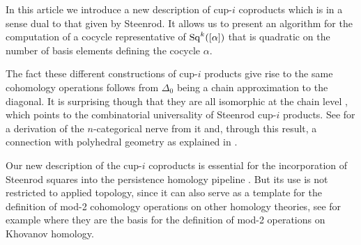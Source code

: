 In this article we introduce a new description of cup-$i$ coproducts which is in a sense dual to that given by Steenrod.
It allows us to present an algorithm for the computation of a cocycle representative of $\mathrm{Sq}^k([\alpha])$ that is quadratic on the number of basis elements defining the cocycle $\alpha$.

The fact these different constructions of cup-$i$ products give rise to the same cohomology operations follows from $\Delta_0$ being a chain approximation to the diagonal.
It is surprising though that they are all isomorphic at the chain level \cite{medina2018axiomatic}, which points to the combinatorial universality of Steenrod cup-$i$ products.
See \cite{medina2020globular} for a derivation of the $n$-categorical nerve from it and, through this result, a connection with polyhedral geometry as explained in \cite{bibid}.

Our new description of the cup-$i$ coproducts is essential for the incorporation of Steenrod squares into the persistence homology pipeline \cite{medina2018persistence}.
But its use is not restricted to applied topology, since it can also serve as a template for the definition of mod-2 cohomology operations on other homology theories, see for example \cite{bibid} where they are the basis for the definition of mod-2 operations on Khovanov homology.